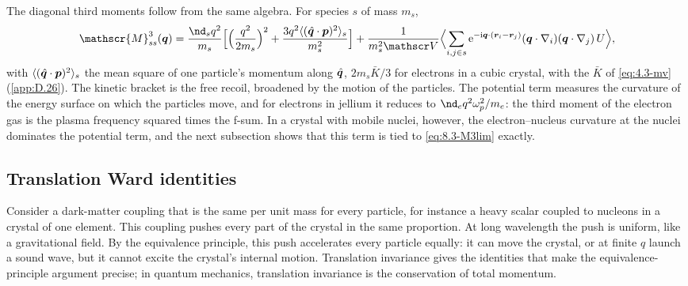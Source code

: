 The diagonal third moments follow from the same algebra. For species $s$ of mass $m_s$,
\begin{equation}
  \mathscr{M}^3_{ss}(\vect{q}) = \frac{\nd_sq^2}{m_s}\Bigl[\Bigl(\frac{q^2}{2m_s}\Bigr)^2 + \frac{3q^2\langle(\hat{\vect{q}}\cdot\vect{p})^2\rangle_s}{m_s^2}\Bigr]
  + \frac{1}{m_s^2\Vol}\Bigl\langle\sum_{i,j\in s}\ee^{-\ii\vect{q}\cdot(\vect{r}_i - \vect{r}_j)}(\vect{q}\cdot\nabla_i)(\vect{q}\cdot\nabla_j)\,U\Bigr\rangle ,
  \label{eq:8.3-M3ss}
\end{equation}
with $\langle(\hat{\bm{q}}\cdot\bm{p})^2\rangle_s$ the mean square of one particle's momentum along $\hat{\bm{q}}$, $2m_s\bar K/3$ for electrons in a cubic crystal, with the $\bar K$ of \cref{eq:4.3-mv} (\cref{app:D.26}). The kinetic bracket is the free recoil, broadened by the motion of the particles. The potential term measures the curvature of the energy surface on which the particles move, and for electrons in jellium it reduces to $\nd_eq^2\omega_p^2/m_e$: the third moment of the electron gas is the plasma frequency squared times the f-sum. In a crystal with mobile nuclei, however, the electron--nucleus curvature at the nuclei dominates the potential term, and the next subsection shows that this term is tied to \cref{eq:8.3-M3lim} exactly.

\subsection{Translation Ward identities}\label{sec:8.3-ward}

Consider a dark-matter coupling that is the same per unit mass for every particle, for instance a heavy scalar coupled to nucleons in a crystal of one element. This coupling pushes every part of the crystal in the same proportion. At long wavelength the push is uniform, like a gravitational field. By the equivalence principle, this push accelerates every particle equally: it can move the crystal, or at finite $q$ launch a sound wave, but it cannot excite the crystal's internal motion. Translation invariance gives the identities that make the equivalence-principle argument precise; in quantum mechanics, translation invariance is the conservation of total momentum.

